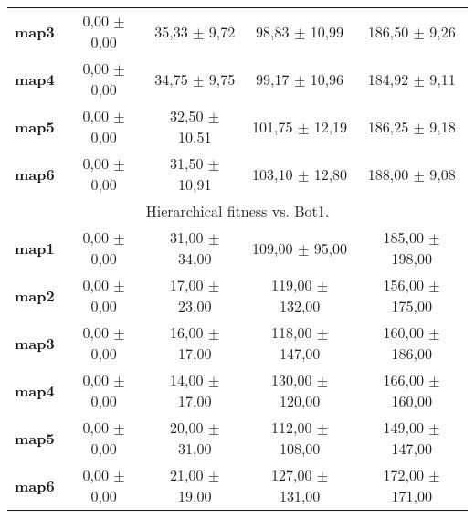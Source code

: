\begin{table}[htbp]
\begin{tabular}{ccccc}
    \textbf{map3} & 0,00  $\pm$ 0,00  & 35,33 $\pm$ 9,72  & 98,83 $\pm$ 10,99 & 186,50 $\pm$ 9,26 \\
    \textbf{map4} & 0,00  $\pm$ 0,00  & 34,75 $\pm$ 9,75  & 99,17 $\pm$ 10,96 & 184,92 $\pm$ 9,11 \\
    \textbf{map5} & 0,00  $\pm$ 0,00  & 32,50 $\pm$ 10,51 & 101,75 $\pm$ 12,19 & 186,25 $\pm$ 9,18 \\
    \textbf{map6} & 0,00  $\pm$ 0,00  & 31,50 $\pm$ 10,91 & 103,10 $\pm$ 12,80 & 188,00 $\pm$ 9,08 \\
\hline
\multicolumn{5}{c}{Hierarchical fitness vs. Bot1.}\\ \hline
    \textbf{map1} & 0,00  $\pm$  0,00  & 31,00 $\pm$   34,00 & 109,00 $\pm$  95,00 & 185,00 $\pm$  198,00 \\
    \textbf{map2} & 0,00  $\pm$  0,00  & 17,00 $\pm$   23,00 & 119,00 $\pm$  132,00 & 156,00 $\pm$ 175,00 \\
    \textbf{map3} & 0,00  $\pm$  0,00  & 16,00 $\pm$   17,00 & 118,00 $\pm$  147,00 & 160,00 $\pm$ 186,00 \\
    \textbf{map4} & 0,00  $\pm$  0,00  & 14,00 $\pm$   17,00 & 130,00 $\pm$  120,00 & 166,00 $\pm$ 160,00 \\
    \textbf{map5} & 0,00  $\pm$  0,00  & 20,00 $\pm$   31,00 & 112,00 $\pm$  108,00 & 149,00 $\pm$ 147,00 \\
    \textbf{map6} & 0,00  $\pm$  0,00  & 21,00 $\pm$   19,00 & 127,00 $\pm$  131,00 & 172,00 $\pm$ 171,00 \\
    \hline
   \end{tabular}%
  \label{tab:all}%
\end{table}%